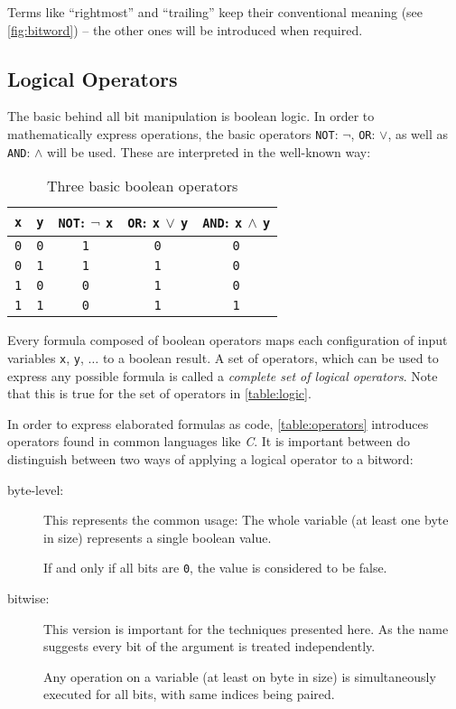 Terms like ``rightmost'' and ``trailing''
keep their conventional meaning (see \autoref{fig:bitword})
-- the other ones will be introduced when required.


\subsection*{Logical Operators}
The basic behind all bit manipulation is boolean logic.
In order to mathematically express operations, the basic operators
\lstinline$NOT$: $\lnot$, \lstinline$OR$: $\lor$,
as well as \lstinline$AND$: $\land$ will be used.
These are interpreted in the well-known way:

\begin{table}[h]
\centering
\begin{tabular}{c|c||c|c|c}
  \lstinline$x$ & \lstinline$y$
& \lstinline$NOT$: $\lnot$ \lstinline$x$
& \lstinline$OR$: \lstinline$x$ $\lor$ \lstinline$y$
& \lstinline$AND$: \lstinline$x$ $\land$ \lstinline$y$\\
\hline\hline
  \lstinline$0$ & \lstinline$0$
& \lstinline$1$ & \lstinline$0$ & \lstinline$0$\\
\hline
  \lstinline$0$ & \lstinline$1$
& \lstinline$1$ & \lstinline$1$ & \lstinline$0$\\
\hline
  \lstinline$1$ & \lstinline$0$
& \lstinline$0$ & \lstinline$1$ & \lstinline$0$\\
\hline
  \lstinline$1$ & \lstinline$1$
& \lstinline$0$ & \lstinline$1$ & \lstinline$1$\\
\end{tabular}
\caption{Three basic boolean operators}
\label{table:logic}
\end{table}

Every formula composed of boolean operators maps
each configuration of input variables
\lstinline$x$, \lstinline$y$, $\dots$ to a boolean result.
A set of operators, which can be used to express any possible formula
is called a \emph{complete set of logical operators}.
Note that this is true for the set of operators in \autoref{table:logic}.

In order to express elaborated formulas as code,
\autoref{table:operators} introduces operators
found in common languages like \emph{C}.
It is important between do distinguish between
two ways of applying a logical operator to a bitword:

\begin{description}
\item[byte-level:] This represents the common usage:
The whole variable (at least one byte in size)
represents a single boolean value.

If and only if all bits are \lstinline$0$,
the value is considered to be false.

\item[bitwise:] This version is important for the techniques presented here.
As the name suggests every bit of the argument is treated independently.

Any operation on a variable (at least on byte in size)
is simultaneously executed for all bits,
with same indices being paired.
\end{description}

